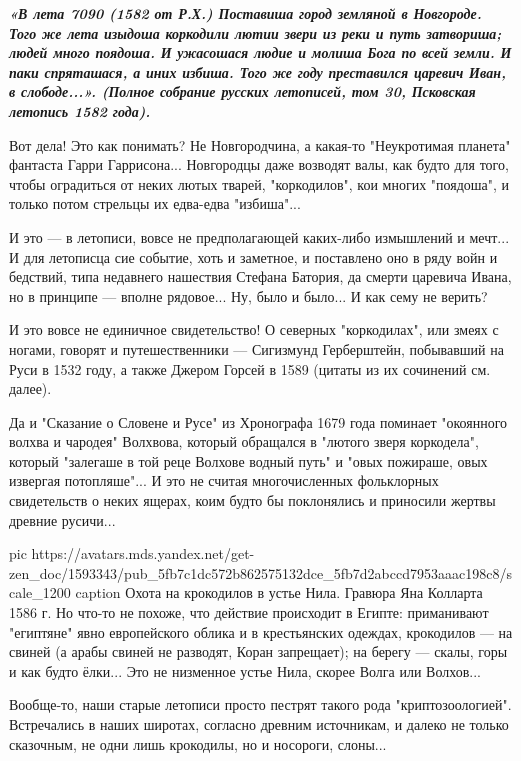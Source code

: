 \begin{leftbar}
  \begingroup
    \em\Large\bfseries\color{blue}
«В лета 7090 (1582 от Р.Х.) Поставиша город земляной в Новгороде. Того же
лета изыдоша коркодили лютии звери из реки и путь затвориша; людей много
поядоша. И ужасошася людие и молиша Бога по всей земли. И паки спряташася,
а иних избиша. Того же году преставился царевич Иван, в слободе...».
(Полное собрание русских летописей, том 30, Псковская летопись 1582 года).
  \endgroup
\end{leftbar}

Вот дела! Это как понимать? Не Новгородчина, а какая-то "Неукротимая планета"
фантаста Гарри Гаррисона... Новгородцы даже возводят валы, как будто для того,
чтобы оградиться от неких лютых тварей, "коркодилов", кои многих "поядоша", и
только потом стрельцы их едва-едва "избиша"...

И это — в летописи, вовсе не предполагающей каких-либо измышлений и мечт... И
для летописца сие событие, хоть и заметное, и поставлено оно в ряду войн и
бедствий, типа недавнего нашествия Стефана Батория, да смерти царевича Ивана,
но в принципе — вполне рядовое... Ну, было и было... И как сему не верить?

И это вовсе не единичное свидетельство! О северных "коркодилах", или змеях с
ногами, говорят и путешественники — Сигизмунд Герберштейн, побывавший на Руси в
1532 году, а также Джером Горсей в 1589 (цитаты из их сочинений см. далее).

Да и "Сказание о Словене и Русе" из Хронографа 1679 года поминает "окоянного
волхва и чародея" Волхвова, который обращался в "лютого зверя коркодела",
который "залегаше в той реце Волхове водный путь" и "овых пожираше, овых
извергая потопляше"... И это не считая многочисленных фольклорных свидетельств
о неких ящерах, коим будто бы поклонялись и приносили жертвы древние русичи...

\ifcmt
  pic https://avatars.mds.yandex.net/get-zen_doc/1593343/pub_5fb7c1dc572b862575132dce_5fb7d2abccd7953aaac198c8/scale_1200
	caption Охота на крокодилов в устье Нила. Гравюра Яна Колларта 1586 г. Но что-то не похоже, что действие происходит в Египте: приманивают "египтяне" явно европейского облика и в крестьянских одеждах, крокодилов — на свиней (а арабы свиней не разводят, Коран запрещает); на берегу — скалы, горы и как будто ёлки... Это не низменное устье Нила, скорее Волга или Волхов...
\fi

Вообще-то, наши старые летописи просто пестрят такого рода "криптозоологией".
Встречались в наших широтах, согласно древним источникам, и далеко не только
сказочным, не одни лишь крокодилы, но и носороги, слоны...

